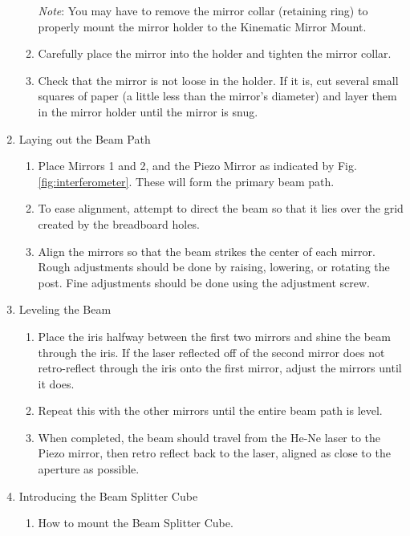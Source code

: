 \begin{enumerate}
\begin{enumerate}
        \emph{Note}: You may have to remove the mirror collar (retaining ring)
        to properly mount the mirror holder to the Kinematic Mirror Mount.
        \item Carefully place the mirror into the holder and tighten the mirror
        collar.
        \item Check that the mirror is not loose in the holder. If it is, cut
        several small squares of paper (a little less than the mirror's
        diameter) and layer them in the mirror holder until the mirror is snug.
        \end{enumerate}
    \item Laying out the Beam Path
        \begin{enumerate}
        \item Place Mirrors 1 and 2, and the Piezo Mirror as indicated by Fig.
        \ref{fig:interferometer}. These will form the primary beam path. 
        \item To ease alignment, attempt to direct the beam so that it lies over
        the grid created by the breadboard holes.
        \item Align the mirrors so that the beam strikes the center of each
        mirror. Rough adjustments should be done by raising, lowering, or
        rotating the post. Fine adjustments should be done using the adjustment
        screw.
        \end{enumerate}
    \item Leveling the Beam
    \label{step:leveling}
        \begin{enumerate}
        \item Place the iris halfway between the first two mirrors and shine the
        beam through the iris. If the laser reflected off of the
        second mirror does not retro-reflect through the iris onto the first mirror,
        adjust the mirrors until it does.
        \item Repeat this with the other mirrors until the entire beam path is
        level.
        \item When completed, the beam should travel from the He-Ne laser to the
        Piezo mirror, then retro reflect back to the laser, aligned as close to
        the aperture as possible.
        \end{enumerate}
    \item Introducing the Beam Splitter Cube
        \begin{enumerate}
		\item How to mount the Beam Splitter Cube.

\end{enumerate}
\end{enumerate}
